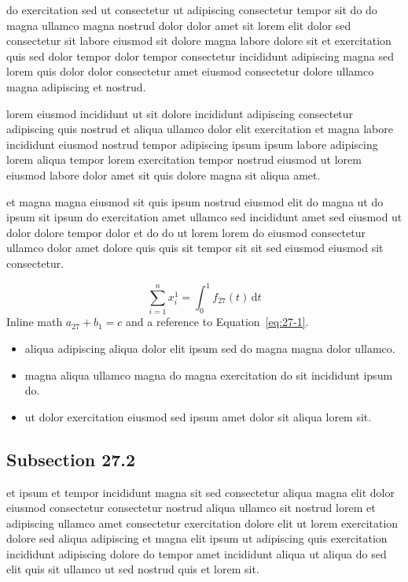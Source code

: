 \documentclass{article}
\begin{document}
do exercitation sed ut consectetur ut adipiscing consectetur tempor sit do do magna ullamco magna nostrud dolor dolor amet sit lorem elit dolor sed consectetur sit labore eiusmod sit dolore magna labore dolore sit et exercitation quis sed dolor tempor dolor tempor consectetur incididunt adipiscing magna sed lorem quis dolor dolor consectetur amet eiusmod consectetur dolore ullamco magna adipiscing et nostrud.

lorem eiusmod incididunt ut sit dolore incididunt adipiscing consectetur adipiscing quis nostrud et aliqua ullamco dolor elit exercitation et magna labore incididunt eiusmod nostrud tempor adipiscing ipsum ipsum labore adipiscing lorem aliqua tempor lorem exercitation tempor nostrud eiusmod ut lorem eiusmod labore dolor amet sit quis dolore magna sit aliqua amet.

et magna magna eiusmod sit quis ipsum nostrud eiusmod elit do magna ut do ipsum sit ipsum do exercitation amet ullamco sed incididunt amet sed eiusmod ut dolor dolore tempor dolor et do do ut lorem lorem do eiusmod consectetur ullamco dolor amet dolore quis quis sit tempor sit sit sed eiusmod eiusmod sit consectetur.

\begin{equation}\label{eq:27-1}
  \sum_{i=1}^{n} x_i^{1} = \int_0^1 f_{27}(t)\,\mathrm{d}t
\end{equation}
Inline math $a_{27} + b_{1} = c$ and a reference to Equation~\eqref{eq:27-1}.

\begin{itemize}
  \item aliqua adipiscing aliqua dolor elit ipsum sed do magna magna dolor ullamco.
  \item magna aliqua ullamco magna do magna exercitation do sit incididunt ipsum do.
  \item ut dolor exercitation eiusmod sed ipsum amet dolor sit aliqua lorem sit.
\end{itemize}

\subsection{Subsection 27.2}\label{sec:27-2}
et ipsum et tempor incididunt magna sit sed consectetur aliqua magna elit dolor eiusmod consectetur consectetur nostrud aliqua ullamco sit nostrud lorem et adipiscing ullamco amet consectetur exercitation dolore elit ut lorem exercitation dolore sed aliqua adipiscing et magna elit ipsum ut adipiscing quis exercitation incididunt adipiscing dolore do tempor amet incididunt aliqua ut aliqua do sed elit quis sit ullamco ut sed nostrud quis et lorem sit.
\end{document}
